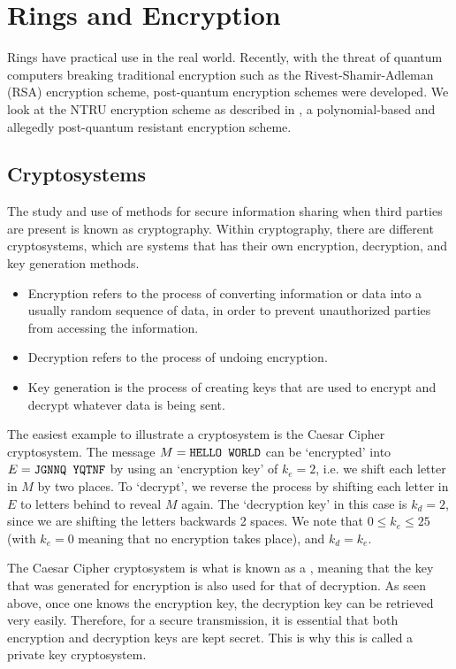 \chapter{Rings and Encryption}
Rings have practical use in the real world. Recently, with the threat of quantum computers breaking traditional encryption such as the Rivest-Shamir-Adleman (RSA) encryption scheme, post-quantum encryption schemes were developed. We look at the NTRU encryption scheme as described in \cite{hoffstein_pipher_silverman_1996}, a polynomial-based and allegedly post-quantum resistant encryption scheme.

\section{Cryptosystems}
The study and use of methods for secure information sharing when third parties are present is known as cryptography. Within cryptography, there are different cryptosystems, which are systems that has their own encryption, decryption, and key generation methods.
\begin{itemize}
    \item Encryption refers to the process of converting information or data into a usually random sequence of data, in order to prevent unauthorized parties from accessing the information.
    \item Decryption refers to the process of undoing encryption.
    \item Key generation is the process of creating keys that are used to encrypt and decrypt whatever data is being sent.
\end{itemize}

\begin{example}
    The easiest example to illustrate a cryptosystem is the Caesar Cipher cryptosystem. The message $M = \texttt{HELLO WORLD}$ can be `encrypted' into $E = \texttt{JGNNQ YQTNF}$ by using an `encryption key' of $k_e = 2$, i.e. we shift each letter in $M$ by two places. To `decrypt', we reverse the process by shifting each letter in $E$ to letters behind to reveal $M$ again. The `decryption key' in this case is $k_d = 2$, since we are shifting the letters backwards 2 spaces. We note that $0 \leq k_e \leq 25$ (with $k_e = 0$ meaning that no encryption takes place), and $k_d = k_e$.
\end{example}

The Caesar Cipher cryptosystem is what is known as a , meaning that the key that was generated for encryption is also used for that of decryption. As seen above, once one knows the encryption key, the decryption key can be retrieved very easily. Therefore, for a secure transmission, it is essential that both encryption and decryption keys are kept secret. This is why this is called a private key cryptosystem.

